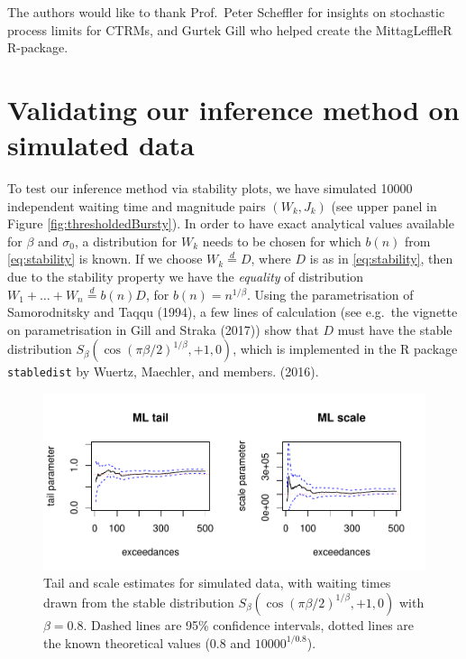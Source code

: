 \documentclass[smallextended]{svjour3}       %
\begin{document}
The authors would like to thank Prof.~Peter Scheffler for insights on
stochastic process limits for CTRMs, and Gurtek Gill who helped create
the MittagLeffleR R-package.

\appendix

\section{Validating our inference method on simulated
data}\label{validating-our-inference-method-on-simulated-data}

To test our inference method via stability plots, we have simulated
10000 independent waiting time and magnitude pairs \((W_k, J_k)\) (see
upper panel in Figure \ref{fig:thresholdedBursty}). In order to have
exact analytical values available for \(\beta\) and \(\sigma_0\), a
distribution for \(W_k\) needs to be chosen for which \(b(n)\) from
\eqref{eq:stability} is known. If we choose \(W_k \stackrel{d}{=} D\),
where \(D\) is as in \eqref{eq:stability}, then due to the stability
property we have the \emph{equality} of distribution
\(W_1 + \ldots + W_n \stackrel{d}{=} b(n) D\), for
\(b(n) = n^{1/\beta}\). Using the parametrisation of Samorodnitsky and
Taqqu (1994), a few lines of calculation (see e.g.~the vignette on
parametrisation in Gill and Straka (2017)) show that \(D\) must have the
stable distribution \(S_\beta(\cos(\pi \beta/2)^{1/\beta}, +1, 0)\),
which is implemented in the R package \texttt{stabledist} by Wuertz,
Maechler, and members. (2016).

\begin{figure}
\includegraphics[width=\textwidth]{article_springer_files/figure-latex/simulated-example-1} \caption{Tail and scale estimates for simulated data, with waiting times drawn from the stable distribution $S_\beta(\cos(\pi \beta/2)^{1/\beta}, +1, 0)$ with $\beta = 0.8$. Dashed lines are 95\% confidence intervals, dotted lines are the known theoretical values ($0.8$ and $10000^{1/0.8}$). \label{fig:sim}}\label{fig:simulated-example}
\end{figure}
\end{document}
